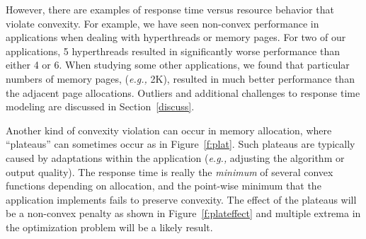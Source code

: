 However, there are examples of response time versus resource behavior that violate convexity.   For example, we have seen non-convex performance in applications when dealing with hyperthreads or memory pages.  For two of our applications, 5 hyperthreads resulted in significantly worse performance than either 4 or 6.  When studying some other applications, we found that particular numbers of memory pages, (\emph{e.g.,} 2K), resulted in much better performance than the adjacent page allocations.  Outliers and additional challenges to response time modeling are discussed in Section~\ref{discuss}.

Another kind of convexity violation can occur in memory allocation, where ``plateaus'' can sometimes occur as in Figure~\ref{f:plat}. Such plateaus are typically caused by adaptations within the application (\emph{e.g.,} adjusting the algorithm or output quality).
The response time is really the \emph{minimum} of several convex functions depending on allocation, and the point-wise minimum that the application implements fails to preserve convexity.  The effect of the plateaus will be a non-convex penalty as shown in Figure~\ref{f:plateffect} and multiple extrema in the optimization problem will be a likely result. 



